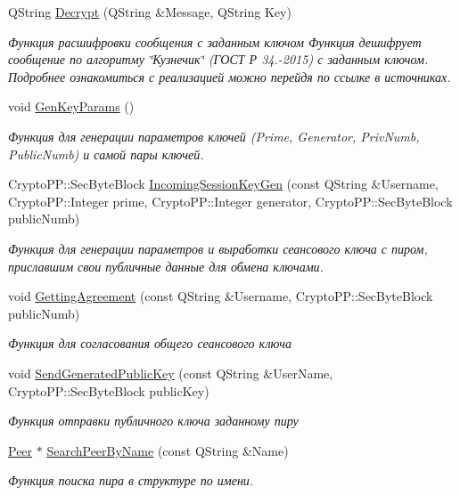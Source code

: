 \begin{DoxyCompactItemize}
Q\+String \hyperlink{class_client_window_ad577402b282f11ee0be8e1772acc9d8c}{Decrypt} (Q\+String \&Message, Q\+String Key)
\begin{DoxyCompactList}\small\item\em Функция расшифровки сообщения с заданным ключом Функция дешифрует сообщение по алгоритму \char`\"{}Кузнечик\char`\"{} (ГОСТ Р 34.-\/2015) с заданным ключом. Подробнее ознакомиться с реализацией можно перейдя по ссылке в источниках. \end{DoxyCompactList}\item 
void \hyperlink{class_client_window_a80e1035659b8f9867ac4c40920617cec}{Gen\+Key\+Params} ()
\begin{DoxyCompactList}\small\item\em Функция для генерации параметров ключей (Prime, Generator, Priv\+Numb, Public\+Numb) и самой пары ключей. \end{DoxyCompactList}\item 
Crypto\+P\+P\+::\+Sec\+Byte\+Block \hyperlink{class_client_window_aeef0e4f3943b8d83aba3d8f1f784562b}{Incoming\+Session\+Key\+Gen} (const Q\+String \&Username, Crypto\+P\+P\+::\+Integer prime, Crypto\+P\+P\+::\+Integer generator, Crypto\+P\+P\+::\+Sec\+Byte\+Block public\+Numb)
\begin{DoxyCompactList}\small\item\em Функция для генерации параметров и выработки сеансового ключа с пиром, приславшим свои публичные данные для обмена ключами. \end{DoxyCompactList}\item 
void \hyperlink{class_client_window_ad44d1603d88233c0f18dba2f64198da1}{Getting\+Agreement} (const Q\+String \&Username, Crypto\+P\+P\+::\+Sec\+Byte\+Block public\+Numb)
\begin{DoxyCompactList}\small\item\em Функция для согласования общего сеансового ключа \end{DoxyCompactList}\item 
void \hyperlink{class_client_window_a64b8023ab0edf40ea745b667039846e6}{Send\+Generated\+Public\+Key} (const Q\+String \&User\+Name, Crypto\+P\+P\+::\+Sec\+Byte\+Block public\+Key)
\begin{DoxyCompactList}\small\item\em Функция отправки публичного ключа заданному пиру \end{DoxyCompactList}\item 
\hyperlink{class_peer}{Peer} $\ast$ \hyperlink{class_client_window_a040d239df2ae3f017b371ed2367642e5}{Search\+Peer\+By\+Name} (const Q\+String \&Name)
\begin{DoxyCompactList}\small\item\em Функция поиска пира в структуре по имени. \end{DoxyCompactList}\end{DoxyCompactItemize}
